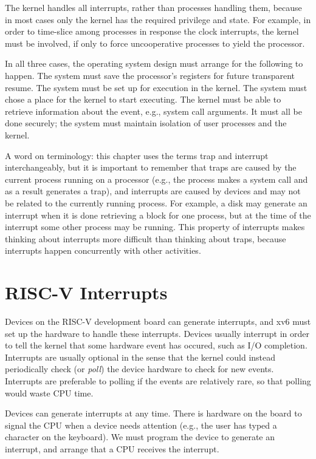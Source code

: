 The kernel handles all interrupts, rather than processes
handling them, because in most cases only the kernel has the
required privilege and state. For example, in order to time-slice
among processes in response the clock interrupts, the kernel
must be involved, if only to force uncooperative processes to
yield the processor.

In all three cases, the operating system design must arrange for the
following to happen.  The system must save the processor's registers for future
transparent resume.  The system must be set up for execution
in the kernel.  The system must chose a place for the kernel to start
executing. The kernel must be able to retrieve information about the
event, e.g., system call arguments.  It must all be done securely; the system
must maintain isolation of user processes and the kernel.

A word on terminology: this chapter uses the terms trap and interrupt
interchangeably, but it is important to remember that traps are caused
by the current process running on a processor (e.g., the process makes
a system call and as a result generates a trap), and interrupts are
caused by devices and may not be related to the currently running
process.  For example, a disk may generate an interrupt when it is
done retrieving a block for one process, but at the time of the
interrupt some other process may be running.  This property of
interrupts makes thinking about interrupts more difficult than
thinking about traps, because interrupts happen concurrently with
other activities.

\section{RISC-V Interrupts}

Devices on the RISC-V development board can generate interrupts, and
xv6 must set up the hardware to handle these interrupts.  Devices
usually interrupt in order to tell the kernel that some hardware event
has occured, such as I/O completion.  Interrupts are usually optional
in the sense that the kernel could instead periodically check (or
\textit{poll}) the device hardware to check for new
events.  Interrupts are preferable to polling if the events are
relatively rare, so that polling would waste CPU time.

Devices can generate interrupts
at any time.  There is hardware on the board to signal the CPU
when a device needs attention (e.g., the user has typed a character on
the keyboard). We must program the device to generate an interrupt, and
arrange that a CPU receives the interrupt. 

